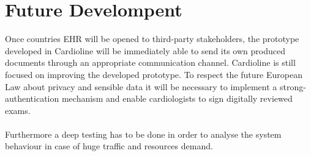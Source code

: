 \section{Future Develompent}
Once countries EHR will be opened to third-party stakeholders, the prototype developed in Cardioline will be immediately able to send its own produced documents through an appropriate communication channel.
Cardioline is still focused on improving the developed prototype. To respect the future European Law about privacy and sensible data it will be necessary to implement a strong-authentication mechanism and enable cardiologists to sign digitally reviewed exams.\\ \\
Furthermore a deep testing has to be done in order to analyse the system behaviour in case of huge traffic and resources demand.